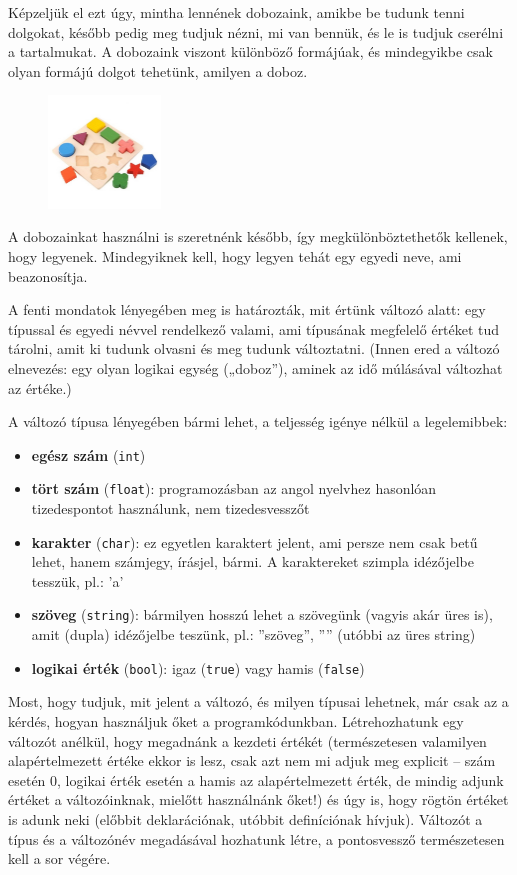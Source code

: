 \documentclass[a4paper]{article}
\begin{document}
	Képzeljük el ezt úgy, mintha lennének dobozaink, amikbe be tudunk tenni dolgokat, később pedig meg tudjuk nézni, mi van bennük, és le is tudjuk cserélni a tartalmukat. A dobozaink viszont különböző formájúak, és mindegyikbe csak olyan formájú dolgot tehetünk, amilyen a doboz.
	
	\begin{figure}[h!]
		\centering
		\includegraphics[width=3cm]{figures/variables.jpg}
	\end{figure}
	
	A dobozainkat használni is szeretnénk később, így megkülönböztethetők kellenek, hogy legyenek. Mindegyiknek kell, hogy legyen tehát egy egyedi neve, ami beazonosítja.
	
	A fenti mondatok lényegében meg is határozták, mit értünk változó alatt: egy típussal és egyedi névvel rendelkező valami, ami típusának megfelelő értéket tud tárolni, amit ki tudunk olvasni és meg tudunk változtatni. (Innen ered a változó elnevezés: egy olyan logikai egység („doboz”), aminek az idő múlásával változhat az értéke.)
	
	A változó típusa lényegében bármi lehet, a teljesség igénye nélkül a legelemibbek:
	\begin{itemize}
		\item \textbf{egész szám} (\lstinline{int})
		\item \textbf{tört szám} (\lstinline{float}): programozásban az angol nyelvhez hasonlóan tizedespontot használunk, nem tizedesvesszőt
		\item \textbf{karakter} (\lstinline{char}): ez egyetlen karaktert jelent, ami persze nem csak betű lehet, hanem számjegy, írásjel, bármi. A karaktereket szimpla idézőjelbe tesszük, pl.: ’a’
		\item \textbf{szöveg} (\lstinline{string}): bármilyen hosszú lehet a szövegünk (vagyis akár üres is), amit (dupla) idézőjelbe teszünk, pl.: ”szöveg”, ”” (utóbbi az üres string)
		\item \textbf{logikai érték} (\lstinline{bool}): igaz (\lstinline{true}) vagy hamis (\lstinline{false})
	\end{itemize}
	
	Most, hogy tudjuk, mit jelent a változó, és milyen típusai lehetnek, már csak az a kérdés, hogyan használjuk őket a programkódunkban. Létrehozhatunk egy változót anélkül, hogy megadnánk a kezdeti értékét (természetesen valamilyen alapértelmezett értéke ekkor is lesz, csak azt nem mi adjuk meg explicit – szám esetén 0, logikai érték esetén a hamis az alapértelmezett érték, de mindig adjunk értéket a változóinknak, mielőtt használnánk őket!) és úgy is, hogy rögtön értéket is adunk neki (előbbit deklarációnak, utóbbit definíciónak hívjuk). Változót a típus és a változónév megadásával hozhatunk létre, a pontosvessző természetesen kell a sor végére.
	
\end{document}
